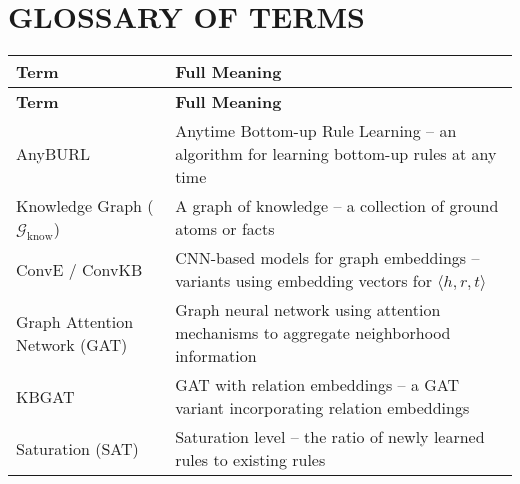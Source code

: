 \pagebreak
{}
{}
\section*{\textbf{ \Large GLOSSARY OF TERMS}}

\begin{center}
	\begin{longtable}{|p{5cm}|p{10cm}|}
		\hline
		\textbf{Term} & \textbf{Full Meaning} \\
		\hline
		\endfirsthead
		
		\hline
		\textbf{Term} & \textbf{Full Meaning} \\
		\hline
		\endhead
		
		\hline
		\endfoot
		
		\hline
		\endlastfoot
		
		AnyBURL & Anytime Bottom-up Rule Learning – an algorithm for learning bottom-up rules at any time \\
		\hline
		
		Knowledge Graph ($\mathcal{G}_{\text{know}}$) & A graph of knowledge – a collection of ground atoms or facts \\
		\hline
		
		ConvE / ConvKB & CNN-based models for graph embeddings – variants using embedding vectors for $\langle h, r, t \rangle$ \\
		\hline
		
		Graph Attention Network (GAT) & Graph neural network using attention mechanisms to aggregate neighborhood information \\
		\hline
		
		KBGAT & GAT with relation embeddings – a GAT variant incorporating relation embeddings \\
		\hline
		
		Saturation (SAT) & Saturation level – the ratio of newly learned rules to existing rules \\
		\hline
		
	\end{longtable}
\end{center}

\pagebreak
